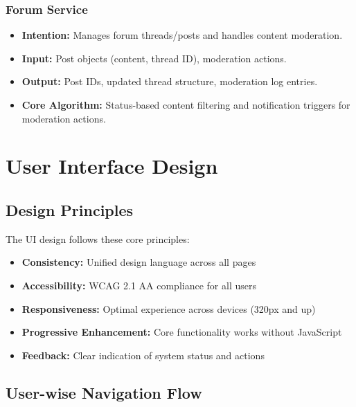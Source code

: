 \documentclass[a4paper, 11pt]{scrreprt}
\begin{document}
\subsection{Forum Service}
\begin{itemize}
    \item \textbf{Intention:} Manages forum threads/posts and handles content moderation.
    \item \textbf{Input:} Post objects (content, thread ID), moderation actions.
    \item \textbf{Output:} Post IDs, updated thread structure, moderation log entries.
    \item \textbf{Core Algorithm:} Status-based content filtering and notification triggers for moderation actions.
\end{itemize}


\chapter{User Interface Design}

\section{Design Principles}
The UI design follows these core principles:
\begin{itemize}
    \item \textbf{Consistency:} Unified design language across all pages
    \item \textbf{Accessibility:} WCAG 2.1 AA compliance for all users
    \item \textbf{Responsiveness:} Optimal experience across devices (320px and up)
    \item \textbf{Progressive Enhancement:} Core functionality works without JavaScript
    \item \textbf{Feedback:} Clear indication of system status and actions
\end{itemize}



\section{User-wise Navigation Flow}
\end{document}

